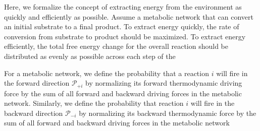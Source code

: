 Here, we formalize the concept of extracting energy from the environment as quickly and efficiently as possible. Assume a metabolic network that can convert an initial substrate to a final product. To extract energy quickly, the rate of conversion from substrate to product should be maximized.  To extract energy efficiently, the total free energy change for the overall reaction should be distributed as evenly as possible across each step of the 


For a metabolic network, we define the probability that a reaction $i$ will fire in the forward  direction ${\mathcal P_{+i}}$ by normalizing its forward thermodynamic driving force by the sum of all forward and backward driving forces in the metabolic network. Similarly, we define the probability that reaction $i$ will fire in the backward direction $\mathcal P_{-i}$ by normalizing its backward thermodynamic force by  the sum of all forward and backward driving forces in the metabolic network